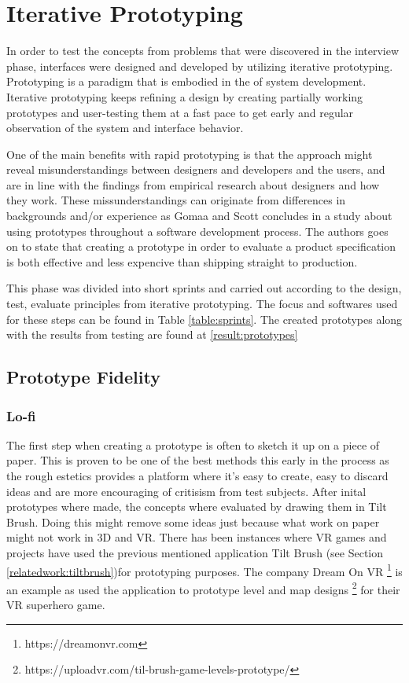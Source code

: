\section{Iterative Prototyping}
In order to test the concepts from problems that were discovered in the interview phase, interfaces were designed and developed by utilizing iterative prototyping. Prototyping is a paradigm that is embodied in the  of system development\cite{proto:Gomaa1981}. Iterative prototyping keeps refining a design by creating partially working prototypes and user-testing them at a fast pace to get early and regular observation of the system and interface behavior\cite{proto:hartson2012ux}.

One of the main benefits with rapid prototyping is that the approach might reveal misunderstandings between designers and developers and the users, and are in line with the findings from empirical research about designers and how they work\cite{proto:tripp1990rapid}. These missunderstandings can originate from differences in backgrounds and/or experience as Gomaa and Scott concludes in a study about using prototypes throughout a software development process.\cite{proto:Lichter1993} The authors goes on to state that creating a prototype in order to evaluate a product specification is both effective and less expencive than shipping straight to production.

This phase was divided into short sprints and carried out according to the design, test, evaluate principles from iterative prototyping.\cite{proto:hartson2012ux} The focus and softwares used for these steps can be found in Table \ref{table:sprints}. The created prototypes along with the results from testing are found at \ref{result:prototypes}
\subsection{Prototype Fidelity}
\subsubsection{Lo-fi}
\label{method:prototype:lofi}
The first step when creating a prototype is often to sketch it up on a piece of paper. This is proven to be one of the best methods this early in the process as the rough estetics provides a platform where it's easy to create, easy to discard ideas and are more encouraging of critisism from test subjects. \cite{proto:boling1997holistic} After inital prototypes where made, the concepts where evaluated by drawing them in Tilt Brush. Doing this might remove some ideas just because what work on paper might not work in 3D and VR. There has been instances where VR games and projects have used the previous mentioned application Tilt Brush (see Section \ref{relatedwork:tiltbrush})for prototyping purposes. The company Dream On VR \footnote{https://dreamonvr.com} is an example as used the application to prototype level and map designs \footnote{https://uploadvr.com/til-brush-game-levels-prototype/} for their VR superhero game.

